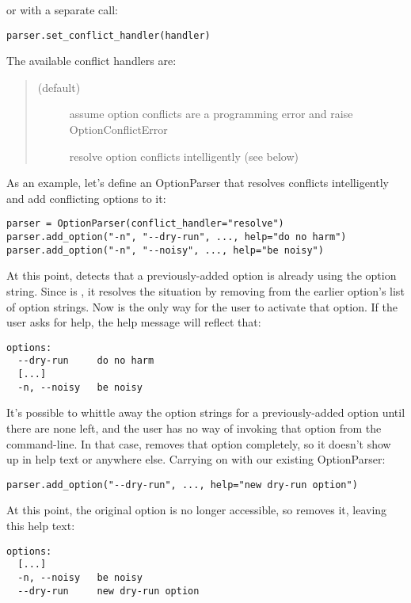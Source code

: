 or with a separate call:
\begin{verbatim}
parser.set_conflict_handler(handler)
\end{verbatim}

The available conflict handlers are:
\begin{quote}
\begin{description}
\item[ (default)]
assume option conflicts are a programming error and raise 
OptionConflictError
\item[]
resolve option conflicts intelligently (see below)
\end{description}
\end{quote}

As an example, let's define an OptionParser that resolves conflicts
intelligently and add conflicting options to it:
\begin{verbatim}
parser = OptionParser(conflict_handler="resolve")
parser.add_option("-n", "--dry-run", ..., help="do no harm")
parser.add_option("-n", "--noisy", ..., help="be noisy")
\end{verbatim}

At this point,  detects that a previously-added option is already
using the  option string.  Since  is
, it resolves the situation by removing  from the
earlier option's list of option strings.  Now  is the
only way for the user to activate that option.  If the user asks for
help, the help message will reflect that:
\begin{verbatim}
options:
  --dry-run     do no harm
  [...]
  -n, --noisy   be noisy
\end{verbatim}

It's possible to whittle away the option strings for a previously-added
option until there are none left, and the user has no way of invoking
that option from the command-line.  In that case,  removes that
option completely, so it doesn't show up in help text or anywhere else.
Carrying on with our existing OptionParser:
\begin{verbatim}
parser.add_option("--dry-run", ..., help="new dry-run option")
\end{verbatim}

At this point, the original  option is no longer
accessible, so  removes it, leaving this help text:
\begin{verbatim}
options:
  [...]
  -n, --noisy   be noisy
  --dry-run     new dry-run option
\end{verbatim}


